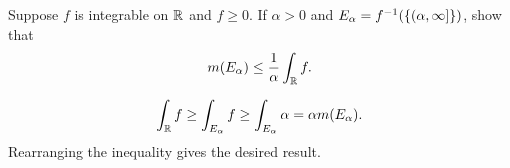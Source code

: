 \begin{exercise}
    Suppose $f$ is integrable on $\mathbb{R}$ and $f\geq 0$. If $\alpha>0$ and 
    $E_\alpha = f^{-1}(\left\{ {(\alpha,\infty]} \right\})$, show that
    \begin{equation*}
        m(E_\alpha) \leq \frac{1}{\alpha}\int_{\mathbb{R}} f.
    \end{equation*}
\end{exercise}
\begin{pf}
    \begin{equation*}
        \int_{\mathbb{R}} f \geq \int_{E_\alpha} f \geq \int_{E_\alpha} \alpha = \alpha m(E_\alpha).
    \end{equation*}
    Rearranging the inequality gives the desired result.
\end{pf}

